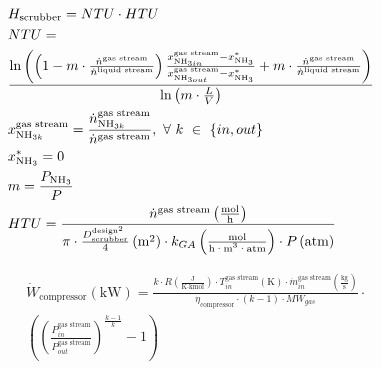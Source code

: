 \begin{refsection}[referencesApD]
\allowdisplaybreaks
\begin{align}	
& H_{\text{scrubber}} = NTU \cdot HTU \label{eq:Hscrubber}
\\
& NTU = \label{eq:Kremser}\\
& \frac{\text{ln}\left(\left(1-m \cdot \frac{\dot{n}^{\text{gas stream}}}{\dot{n}^{\text{liquid stream}}} \right) \frac{x_{\text{NH}_{3 in}}^{\text{gas stream}} - x^*_{\text{NH}_{3}}}{x_{\text{NH}_{3 out}}^{\text{gas stream}} - x^*_{\text{NH}_{3}}} + m \cdot\frac{\dot{n}^{\text{gas stream}}}{\dot{n}^{\text{liquid stream}}}\right)}{\text{ln}\left(m \cdot \frac{L}{V}\right)} \nonumber
\\
&
x_{\text{NH}_{3 k}}^{\text{gas stream}} = \frac{\dot{n}_{\text{NH}_{3 k}}^{\text{gas stream}}}{\dot{n}^{\text{gas stream}}}, \ \forall \ k \ \in \ \{in, out\}
\\
&
x^*_{\text{NH}_{3}} = 0
\\
&
m = \frac{P_{\text{NH}_3}}{P}
\\
& HTU = \frac{\dot{n}^{\text{gas stream}} \left(\frac{\text{mol}}{\text{h}}\right)}{\pi \cdot \frac{D_{\text{scrubber}}^{\text{design}^2}}{4} \left(\text{m}^2\right)\cdot k_{GA} \left(\frac{\text{mol}}{\text{h·m\textsuperscript{3}·atm}}\right)\cdot P \left(\text{atm}\right)}\label{eq:HTU}
\end{align}

\begin{align}
&\dot{W}_{\text{compressor}} \left(\text{kW}\right) = \frac{k \cdot R \left(\frac{\text{J}}{\text{K} \cdot \text{kmol}}\right) \cdot T_{in}^{\text{gas stream}} \left(\text{K}\right) \cdot \dot{m}_{in}^{\text{gas stream}} \left(\frac{\text{kg}}{\text{s}}\right)}{\eta_{\text{compressor}} \cdot \left(k-1\right) \cdot MW_{gas}} \cdot \nonumber \\
&\left(\left(\frac{P_{in}^{\text{gas stream}}}{P_{out}^{\text{gas stream}}}\right)^{\frac{k-1}{k}}-1\right) \label{eq:CompressorEnergy}
\end{align}

\newpage


\end{refsection}

